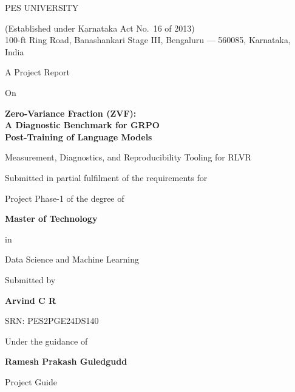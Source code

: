\documentclass[12pt,a4paper]{report}
\begin{document}
\begin{titlepage}
\centering
\thispagestyle{empty}
\vspace*{0.2in}

{\large PES UNIVERSITY\par}
{\footnotesize (Established under Karnataka Act No.\ 16 of 2013)\\
100-ft Ring Road, Banashankari Stage III, Bengaluru --- 560085, Karnataka, India\par}

\vspace{0.5in}
{\normalsize A Project Report\par}
{\normalsize On\par}
\vspace{0.5em}
{\Large\bfseries Zero-Variance Fraction (ZVF):\\[0.35em]
A Diagnostic Benchmark for GRPO\\[0.25em] Post-Training of Language Models\par}
\vspace{0.6em}
{\normalsize Measurement, Diagnostics, and Reproducibility Tooling for RLVR\par}

\vfill

{\large Submitted in partial fulfilment of the requirements for\par}
{\large Project Phase-1 of the degree of\par}
\vspace{0.6em}
{\large\bfseries Master of Technology\par}
\vspace{0.2em}
{\normalsize in\par}
\vspace{0.2em}
{\large Data Science and Machine Learning\par}

\vfill

{\normalsize Submitted by\par}
\vspace{0.3em}
{\large\bfseries Arvind C R\par}
{\normalsize SRN: PES2PGE24DS140\par}

\vspace{0.9em}
{\normalsize Under the guidance of\par}
\vspace{0.2em}
{\large\bfseries Ramesh Prakash Guledgudd\par}
{\normalsize Project Guide\par}


\end{titlepage}
\end{document}
